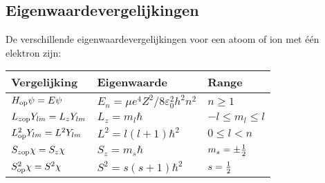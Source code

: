 \subsection[~~Eigenwaardevergelijkingen]{Eigenwaardevergelijkingen}
De verschillende eigenwaardevergelijkingen voor een atoom of ion met \'e\'en
elektron zijn:
\begin{center}
\begin{tabular}{||l|l|l||}
\hline
{\bf Vergelijking}&{\bf Eigenwaarde}&{\bf Range}\\
\hline
\hline
$H_{\rm op}\psi=E\psi$        &$E_n=\mu e^4Z^2/8\varepsilon_0^2h^2n^2$&$n\geq1$\rule{0pt}{14pt}\\
$L_{z\rm op}Y_{lm}=L_zY_{lm}$ &$L_z=m_l\hbar$     &$-l\leq m_l\leq l$\rule{0pt}{14pt}\\
$L^2_{\rm op}Y_{lm}=L^2Y_{lm}$&$L^2=l(l+1)\hbar^2$&$0\leq l<n$\rule{0pt}{14pt}\\
$S_{z\rm op}\chi=S_z\chi$     &$S_z=m_s\hbar$     &$m_s=\pm\mbox{$\frac{1}{2}$}$\rule{0pt}{14pt}\\
$S^2_{\rm op}\chi=S^2\chi$    &$S^2=s(s+1)\hbar^2$&$s=\mbox{$\frac{1}{2}$}$\rule[-5pt]{0pt}{19pt}\\
\hline
\end{tabular}
\end{center}

